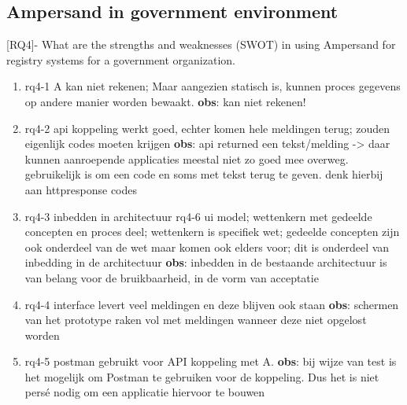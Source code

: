 \def\rq{rq4}


\begin{comment}
RQ4 - Wat zijn de sterke en zwakke punten (SWOT) bij het gebruik van Ampersand voor registratiesystemen voor een overheidsorganisatie.
\end{comment}


\subsection{Ampersand in government environment}
[RQ4]- What are the strengths and weaknesses (SWOT) in using Ampersand for registry systems for a government organization.
\begin{enumerate}
    \item rq4-1 A kan niet rekenen; Maar aangezien  statisch is, kunnen proces gegevens op andere manier worden bewaakt.
    \newline\textbf{obs}: kan niet rekenen!
    
    \item rq4-2 api koppeling werkt goed, echter komen hele meldingen terug; zouden eigenlijk codes moeten krijgen 
    \newline\textbf{obs}: api returned een tekst/melding -> daar kunnen aanroepende applicaties meestal niet zo goed mee overweg. 
    gebruikelijk is om een code en soms met tekst terug te geven. 
    denk hierbij aan httpresponse codes
    
    \item rq4-3 inbedden in architectuur 
    \newline rq4-6 ui model; 
    wettenkern met gedeelde concepten en proces deel; 
    wettenkern is specifiek wet; 
    gedeelde concepten zijn ook onderdeel van de wet maar komen ook elders voor;
    dit is onderdeel van inbedding in de architectuur
    \newline\textbf{obs}: inbedden in de bestaande architectuur is van belang voor de bruikbaarheid, in de vorm van acceptatie
    
    \item rq4-4 interface levert veel meldingen en deze blijven ook staan
    \newline\textbf{obs}: schermen van het prototype raken vol met meldingen wanneer deze niet opgelost worden
    
    \item rq4-5 postman gebruikt voor API koppeling met A. 
    \newline\textbf{obs}: bij wijze van test is het mogelijk om Postman te gebruiken voor de koppeling. 
    Dus het is niet persé nodig om een applicatie hiervoor te bouwen
    

\end{enumerate}

